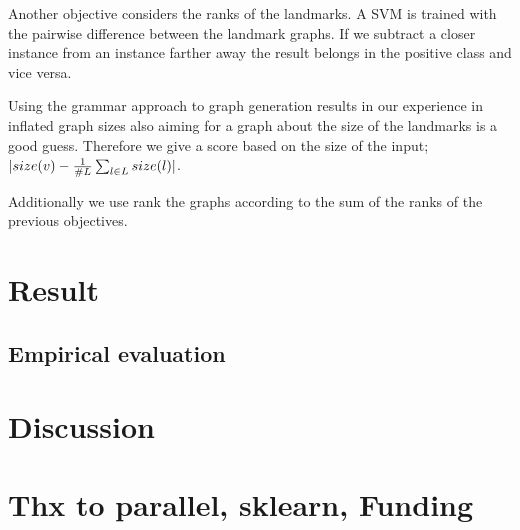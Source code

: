 \documentclass{esannV2} \usepackage[dvips]{graphicx}
\begin{document}
Another objective considers the ranks of the landmarks. A SVM is trained with
the pairwise difference between the landmark graphs. If we subtract a closer
instance from an instance farther away the result belongs in the positive class
and vice versa.


Using the grammar approach to graph generation results in our experience in
inflated graph sizes also aiming for a graph about the size of the landmarks is
a good guess.  Therefore we give a score based on the size of the input;
$|size(v) - {1\over{\#L}} \sum_{l \in L} size(l)|$.

Additionally we use rank the graphs according to the sum of the ranks of the
previous objectives.

\section{Result}

\subsection{Empirical evaluation}




\section{Discussion} 

\section*{Thx to parallel, sklearn, Funding}


  
\end{document}
